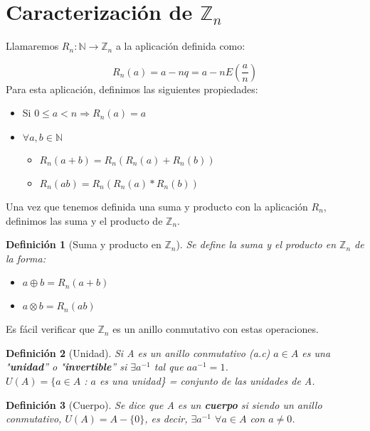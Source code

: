 \documentclass[11pt, a4paper, titlepage]{article}
\providecommand{\ent}{\mathbb{Z}}
\theoremstyle{theorem-style}
\theoremstyle{definition-style}
\newtheorem*{ndef}{Definición}
\theoremstyle{remark-style}
\theoremstyle{example-style}
\begin{document}
\section*{Caracterización de $\mathbb{Z}_{n}$}

Llamaremos $R_n:\mathbb{N} \rightarrow \mathbb{Z}_n$ a la aplicación definida como:

\[
R_n(a) = a - nq = a- nE(\frac{a}{n})
\] 
Para esta aplicación, definimos las siguientes propiedades:

\begin{itemize}
\item Si $0 \leq a < n  \Rightarrow R_n(a) = a$
\item $\forall a,b \in \mathbb{N}$

\begin{itemize}
	\item  $R_n(a+b) = R_n(R_n(a) + R_n(b))$
	\item $R_n(ab) = R_n(R_n(a)*R_n(b))$
\end{itemize}

\end{itemize} 


Una vez que tenemos definida una suma y producto con la aplicación $R_n$, definimos las suma y el producto de $\mathbb{Z}_n$.
\begin{ndef}[Suma y producto en $\ent_n$] Se define la suma y el producto en $\ent_n$ de la forma:
	\begin{itemize}
	\item $a\oplus b = R_n(a+b)$
	\item $a\otimes b = R_n(ab)$
\end{itemize}

\end{ndef}



Es fácil verificar que $\mathbb{Z}_n$ es un anillo conmutativo con estas operaciones.\\

\begin{ndef}[Unidad]
	Si A es un anillo conmutativo (a.c) $a \in A$ es una "\textbf{unidad}” o "\textbf{invertible}” si $\exists a^{-1}$ tal que $ aa^{-1} = 1$.\\ $U(A) = \{ a \in A$ : $a$ es una unidad\} = conjunto de las unidades de A.\\
\end{ndef}



\begin{ndef}[Cuerpo] Se dice que A es un \textbf{cuerpo} si siendo un anillo conmutativo, $U(A) = A - \{0\}$, es decir, $\exists a^{-1}$ $\forall a \in A$ con $a \neq 0$.
\end{ndef}
\end{document}
